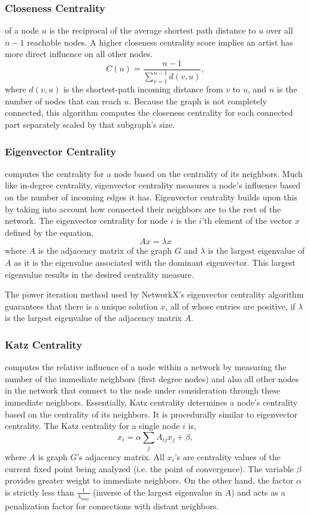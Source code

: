 \documentclass[pageno]{jpaper}
\begin{document}
\subsubsection{Closeness Centrality}
of a node $u$ is the reciprocal of the average shortest path distance to $u$ over all $n-1$ reachable nodes. A higher closeness centrality score implies an artist has more direct influence on all other nodes.
\begin{equation}
C(u) = \frac{n - 1}{\sum_{v=1}^{n-1} d(v, u)},
\end{equation}
where $d(v, u)$ is the shortest-path incoming distance from $v$ to $u$, and $n$ is the number of nodes that can reach $u$. Because the graph is not completely connected, this algorithm computes the closeness centrality for each connected part separately scaled by that subgraph's size.
\subsubsection{Eigenvector Centrality}
computes the centrality for a node based on the centrality of its neighbors. Much like in-degree centrality, eigenvector centrality measures a node's influence based on the number of incoming edges it has. Eigenvector centrality builds upon this by taking into account how connected their neighbors are to the rest of the network.
The eigenvector centrality for node $i$ is the $i$'th element of the vector $x$ defined by the equation,
\begin{equation}
Ax = \lambda x
\end{equation}
where $A$ is the adjacency matrix of the graph $G$ and $\lambda$ is the largest eigenvalue of $A$ as it is the eigenvalue associated with the dominant eigenvector. This largest eigenvalue results in the desired centrality measure.

The power iteration method used by NetworkX's eigenvector centrality algorithm guarantees that there is a unique solution $x$, all of whose entries are positive, if $\lambda$ is the largest eigenvalue of the adjacency matrix $A$. 
\subsubsection{Katz Centrality}
computes the relative influence of a node within a network by measuring the number of the immediate neighbors (first degree nodes) and also all other nodes in the network that connect to the node under consideration through these immediate neighbors. Essentially, Katz centrality determines a node's centrality based on the centrality of its neighbors. It is procedurally similar to eigenvector centrality. The Katz centrality for a single node $i$ is, 
\begin{equation}
x_i = \alpha \sum_{j} A_{ij} x_j + \beta,
\end{equation} where $A$ is graph $G$'s adjacency matrix. All $x_i$'s are centrality values of the current fixed point being analyzed (i.e. the point of convergence). The variable $\beta$ provides greater weight to immediate neighbors. On the other hand, the factor $\alpha$ is strictly less than $\frac{1}{\lambda_{max}}$ (inverse of the largest eigenvalue in $A$) and acts as a penalization factor for connections with distant neighbors. 
\end{document}
